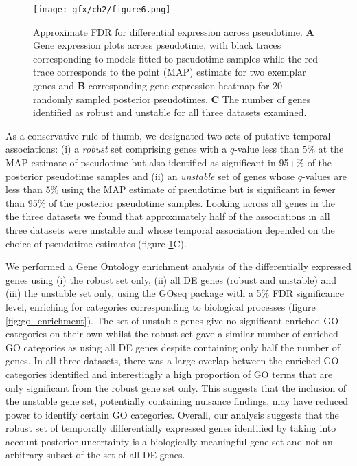 \begin{figure}
	\centering
	\texttt{[image: gfx/ch2/figure6.png]}
\caption[Approximate FDR for differential expression across pseudotime.]{ Approximate FDR for differential expression across pseudotime.
\textbf{A} Gene expression plots across pseudotime, with black traces corresponding to models fitted to pseudotime samples while the red trace corresponds to the point (MAP) estimate for two exemplar genes and \textbf{B} corresponding gene expression heatmap for 20 randomly sampled posterior pseudotimes.
\textbf{C} The number of genes identified as robust and unstable for all three datasets examined.}
\label{fig:afdr}
\end{figure}

As a conservative rule of thumb, we designated two sets of putative temporal associations: (i) a \emph{robust} set comprising genes with a $q$-value less than 5\% at the MAP estimate of pseudotime but also identified as significant in 95+\% of the posterior pseudotime samples and (ii) an \emph{unstable} set of genes whose $q$-values are less than 5\% using the MAP estimate of pseudotime but is significant in fewer than 95\% of the posterior pseudotime samples. Looking across all genes in the the three datasets we found that approximately half of the associations in all three datasets were unstable and whose temporal association depended on the choice of pseudotime estimates (figure \ref{fig:afdr}C).

We performed a Gene Ontology enrichment analysis of the differentially expressed genes using (i) the robust set only, (ii) all DE genes (robust and unstable) and (iii) the unstable set only, using the GOseq package \cite{young2010gene} with a 5\% FDR significance level, enriching for categories corresponding to biological processes (figure \ref{fig:go_enrichment}). The set of unstable genes give no significant enriched GO categories on their own whilst the robust set gave a similar number of enriched GO categories as using all DE genes despite containing only half the number of genes. In all three datasets, there was a large overlap between the enriched GO categories identified and interestingly a high proportion of GO terms that are only significant from the robust gene set only. This suggests that the inclusion of the unstable gene set, potentially containing nuisance findings, may have reduced power to identify certain GO categories. Overall, our analysis suggests that the robust set of temporally differentially expressed genes identified by taking into account posterior uncertainty is a biologically meaningful gene set and not an arbitrary subset of the set of all DE genes.


